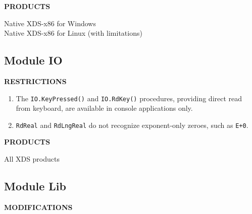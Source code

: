 {\bf PRODUCTS}

Native XDS-x86 for Windows\\
Native XDS-x86 for Linux (with limitations)\\


\subsection{Module IO}

{\bf RESTRICTIONS}

\begin{enumerate}
\item The \verb'IO.KeyPressed()' and \verb'IO.RdKey()' procedures,
      providing direct read from keyboard, are available in console
      applications only.

\item \verb'RdReal' and \verb'RdLngReal' do not recognize exponent-only zeroes,
      such as \verb'E+0'.
\end{enumerate}

{\bf PRODUCTS}

All XDS products


\subsection{Module Lib}

{\bf MODIFICATIONS}

